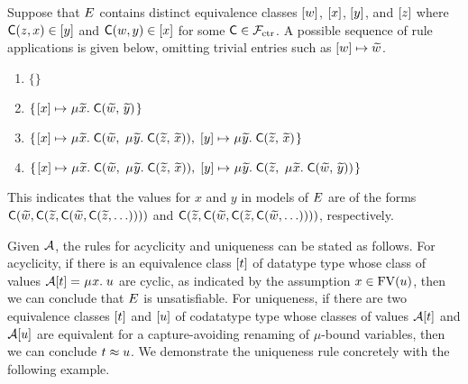 \begin{examplex}
Suppose that $E$ contains distinct equivalence classes $[w]$, $[x]$, $[y]$, and $[z]$
where $\textsf{C}(z,x) \in [y]$ and $\textsf{C}(w,y) \in [x]$ for some $\textsf{C} \in \mathcal{F}_{\mathrm{ctr}}$.
A possible sequence of  rule applications is given below, omitting
trivial entries such as $[w] \mapsto {\widetilde{w}}$.
%
\begin{enumerate}
\item \noindent{}$\{  \}$
\item \noindent{}$\{\vthinspace  \ec{x} \mapsto \MU {\Varec{x}}.\; \const{C}( {\Varec{w}},\, {\Varec{y}} ) \vthinspace\}$
\item \noindent{}$\{\vthinspace  \ec{x} \mapsto \MU {\Varec{x}}.\; \const{C}( {\Varec{w}},\; \MU {\Varec{y}}.\; \const{C}( {\Varec{z}},\, {\Varec{x}} ) ),\;
  \ec{y} \mapsto \MU {\Varec{y}}.\; \const{C}( {\Varec{z}},\, {\Varec{x}} ) \vthinspace\}$
\item \noindent{}$\{\vthinspace  \ec{x} \mapsto \MU {\Varec{x}}.\; \const{C}( {\Varec{w}},\; \MU {\Varec{y}}.\; \const{C}( {\Varec{z}},\, {\Varec{x}} ) ),\;
  \ec{y} \mapsto \MU {\Varec{y}}.\; \const{C}( {\Varec{z}},\; \MU {\Varec{x}}.\; \const{C}( {\Varec{w}},\, {\Varec{y}} ) ) \vthinspace\}$
\end{enumerate}
%
This indicates that the values for $x$ and $y$ in models of $E$
are of the forms $\textsf{C}( {\widetilde{w}}, \textsf{C}( {\widetilde{z}}, \textsf{C}( {\widetilde{w}},\allowbreak \textsf{C}( {\widetilde{z}},\ldots ))))$
and $\textsf{C}( {\widetilde{z}}, \textsf{C}( {\widetilde{w}}, \textsf{C}( {\widetilde{z}}, \textsf{C}( {\widetilde{w}}, \ldots ))))$,
respectively. %
\xend
\end{examplex}

Given $\mathcal{A}$, the rules for acyclicity and uniqueness can be stated as follows.
For acyclicity, if there is an equivalence class $[t]$ of datatype type whose class of values $\Val \ec{t} = \MU x.\; u$ are cyclic,
as indicated by the assumption $x \in \mathrm{FV}( u )$,
then we can conclude that $E$ is unsatisfiable.
For uniqueness, if there are two equivalence classes $[t]$ and $[u]$
of codatatype type whose classes of values $\mathcal{A} [t]$ and $\mathcal{A} [u]$ are equivalent for a capture-avoiding renaming of $\mu$-bound variables,
then we can conclude $t \approx u$.
We demonstrate the uniqueness rule concretely with the following example.

